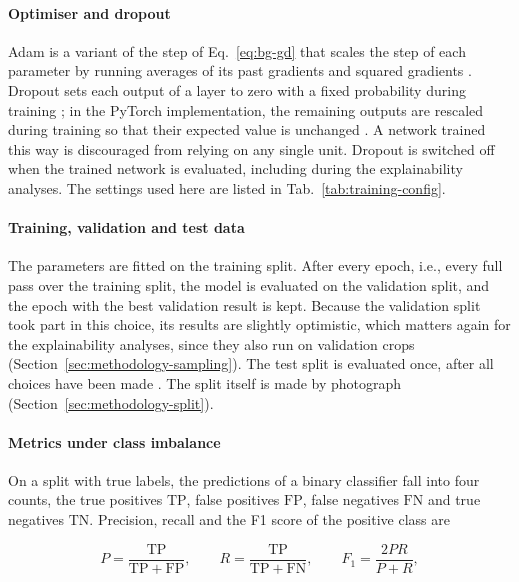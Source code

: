 \paragraph{Optimiser and dropout}
Adam is a variant of the step of Eq.~\eqref{eq:bg-gd} that scales the step of each
parameter by running averages of its past gradients and squared
gradients \citep{kingma2015adam}. Dropout sets each output of a layer to zero with a
fixed probability during training \citep{srivastava2014dropout}; in the PyTorch
implementation, the remaining outputs are rescaled during training so that their expected
value is unchanged \citep{paszke2019pytorch}. A network trained this way is
discouraged from relying on any single unit. Dropout is switched off when the trained
network is evaluated, including during the explainability analyses. The settings used
here are listed in Tab.~\ref{tab:training-config}.

\paragraph{Training, validation and test data}
The parameters are fitted on the training split. After every epoch, i.e., every full pass
over the training split, the model is evaluated on the validation split, and the epoch
with the best validation result is kept. Because the validation split took part in this
choice, its results are slightly optimistic, which matters again for the explainability
analyses, since they also run on validation crops
(Section~\ref{sec:methodology-sampling}). The test split is evaluated once, after all
choices have been made \citep[Sec.~5.3]{goodfellow2016deep}. The split itself is made by
photograph (Section~\ref{sec:methodology-split}).

\paragraph{Metrics under class imbalance}
On a split with true labels, the predictions of a binary classifier fall into four
counts, the true positives $\mathrm{TP}$, false positives $\mathrm{FP}$, false negatives
$\mathrm{FN}$ and true negatives $\mathrm{TN}$. Precision, recall and the F1 score of the
positive class are \citep[Sec.~11.1]{goodfellow2016deep}

\begin{equation}
P = \frac{\mathrm{TP}}{\mathrm{TP} + \mathrm{FP}}, \qquad
R = \frac{\mathrm{TP}}{\mathrm{TP} + \mathrm{FN}}, \qquad
F_1 = \frac{2PR}{P + R},
\label{eq:bg-prf}
\end{equation}

